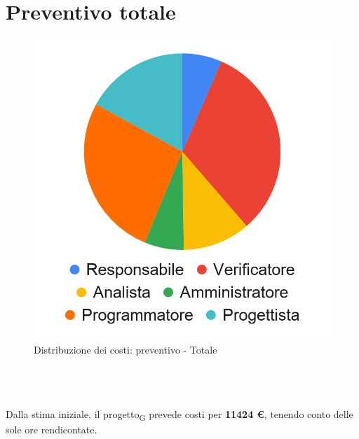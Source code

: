\section{Preventivo totale}


\begin{minipage}{.60\textwidth}
	\smallPreventivoTable{
		
	}
\end{minipage}
\hspace{1cm}
\begin{minipage}{.30\textwidth}
	\begin{figure}[H]
		\includegraphics[scale=0.21]{res/images/charts/preventivo_priori/Grafico4-12.png}
		\caption{Distribuzione dei costi: preventivo - Totale}
	\end{figure}
\end{minipage} 
\\\\\\
Dalla stima iniziale, il progetto\textsubscript{G} prevede costi per \textbf{11424 \euro}, tenendo conto delle sole ore rendicontate.